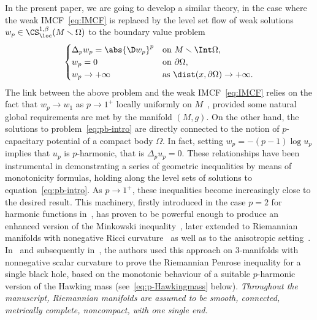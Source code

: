 \documentclass[10pt,a4paper]{amsart}
\numberwithin{equation}{section}
\newcounter{case}
\begin{document}
In the present paper, we are going to develop a similar theory, in the case where the weak IMCF~\eqref{eq:IMCF} is replaced by the level set flow of weak solutions $w_p\in \CS^{1,\beta}_{\loc}(M \smallsetminus \Omega)$ to the boundary value problem
\begin{equation}
\label{eq:pb-intro}
 \begin{cases}
 \Delta_p w_p = \abs{\D w_p}^p &\text{on $M \smallsetminus \Int \Omega$,}\\
 w_p=0 & \text{on $\partial \Omega$,}\\
 w_p\to +\infty & \text{as $\dist(x,\partial \Omega) \to +\infty$.}
 \end{cases}
\end{equation}
The link between the above problem and the weak IMCF~\eqref{eq:IMCF} relies on the fact that $w_p\to w_1$ as $p\to 1^+$ locally uniformly on $M$~\cite{kotschwar_localgradientestimatesharmonic_2009,mari_flowlaplaceapproximationnew_2022, moser_inversemeancurvatureflow_2007,moser_inversemeancurvatureflow_2008}, provided some natural global requirements are met by the manifold $(M, g)$. On the other hand,
the solutions to problem~\eqref{eq:pb-intro} are directly connected to the notion of $p$-capacitary potential of a compact body $\Omega$. In fact, setting $w_p = -(p-1) \log u_p$ implies that $u_p$ is $p$-harmonic, that is $\Delta_p u_p = 0$. These relationships have been instrumental in demonstrating a series of geometric inequalities by means of monotonicity formulas, holding along the level sets of solutions to equation~\eqref{eq:pb-intro}. As $p \to 1^+$, these inequalities become increasingly close to the desired result.
This machinery, firstly introduced in the case $p=2$ for harmonic functions in~\cite{agostiniani_sharpgeometricinequalitiesclosed_2020, agostiniani_monotonicityformulaspotentialtheory_2020}, has proven to be powerful enough to produce an enhanced version of the Minkowski inequality~\cite{agostiniani_minkowskiinequalitiesnonlinearpotential_2022, fogagnolo_geometricaspectscapacitarypotentials_2019}, later extended to Riemannian manifolds with nonegative Ricci curvature~\cite{benatti_minkowskiinequalitycompleteriemannian_2022} as well as to the anisotropic setting~\cite{xia_anisotropiccapacityanisotropicminkowski_2022}.
 In~\cite{agostiniani_greenfunctionproofpositive_2021} and subsequently in~\cite{agostiniani_riemannianpenroseinequalitynonlinear_2022}, the authors used this approach on $3$-manifolds with nonnegative scalar curvature to prove the Riemannian Penrose inequality for a single black hole, based on the monotonic behaviour of a suitable $p$-harmonic version of the Hawking mass (see~\eqref{eq:p-Hawkingmass} below).
\emph{Throughout the manuscript, Riemannian manifolds are assumed to be smooth, connected, metrically complete, noncompact, with one single end.}
\end{document}
